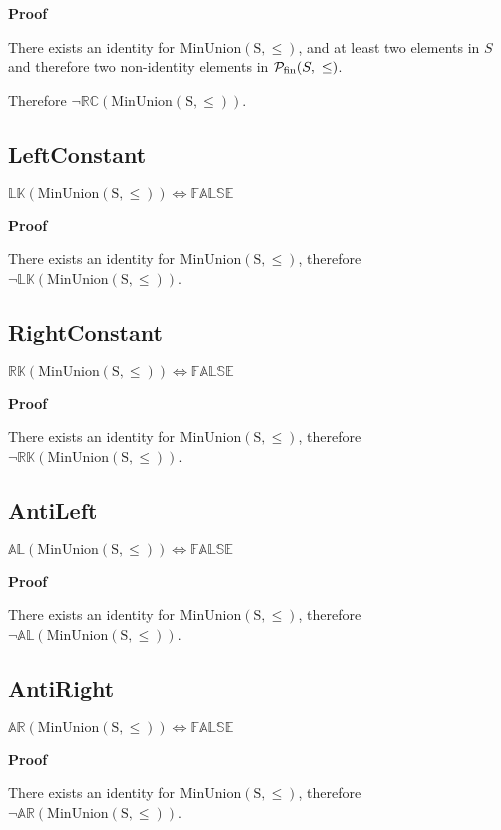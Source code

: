 \documentclass[10pt]{article}
\newcommand{\propname}[1]{{\mathbb{#1}}}
\newcommand{\proof}{\vspace{1em} \textbf{Proof} \vspace{1em}}
\begin{document}
\proof

There exists an identity for $\mathrm{MinUnion(S,\leq)}$, and at least two elements in $S$ and therefore two non-identity elements in ${\cal P}_{\mathrm{fin}}(S,\ \leq)$. 

\vspace{0.5em}

Therefore $\neg \propname{RC}(\mathrm{MinUnion(S,\leq)})$.



\subsection{LeftConstant}
$\propname{LK}(\mathrm{MinUnion(S,\leq)}) \Leftrightarrow \propname{FALSE}$

\proof

There exists an identity for $\mathrm{MinUnion(S,\leq)}$, therefore $\neg \propname{LK}(\mathrm{MinUnion(S,\leq)})$.



\subsection{RightConstant}
$\propname{RK}(\mathrm{MinUnion(S,\leq)}) \Leftrightarrow \propname{FALSE}$

\proof

There exists an identity for $\mathrm{MinUnion(S,\leq)}$, therefore $\neg \propname{RK}(\mathrm{MinUnion(S,\leq)})$.



\subsection{AntiLeft}
$\propname{AL}(\mathrm{MinUnion(S,\leq)}) \Leftrightarrow \propname{FALSE}$

\proof

There exists an identity for $\mathrm{MinUnion(S,\leq)}$, therefore $\neg \propname{AL}(\mathrm{MinUnion(S,\leq)})$.


\subsection{AntiRight}
$\propname{AR}(\mathrm{MinUnion(S,\leq)}) \Leftrightarrow \propname{FALSE}$

\proof

There exists an identity for $\mathrm{MinUnion(S,\leq)}$, therefore $\neg \propname{AR}(\mathrm{MinUnion(S,\leq)})$.
\end{document}

